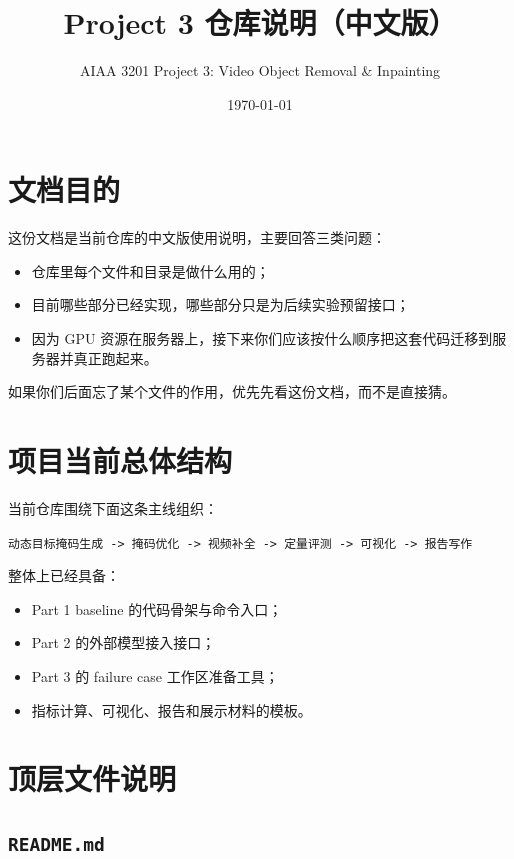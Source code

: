 \documentclass[11pt,a4paper,fontset=none]{ctexart}
\title{Project 3 仓库说明（中文版）}
\author{AIAA 3201 Project 3: Video Object Removal \& Inpainting}
\date{\today}
\begin{document}
\maketitle

\section{文档目的}

这份文档是当前仓库的中文版使用说明，主要回答三类问题：

\begin{itemize}
  \item 仓库里每个文件和目录是做什么用的；
  \item 目前哪些部分已经实现，哪些部分只是为后续实验预留接口；
  \item 因为 GPU 资源在服务器上，接下来你们应该按什么顺序把这套代码迁移到服务器并真正跑起来。
\end{itemize}

如果你们后面忘了某个文件的作用，优先先看这份文档，而不是直接猜。

\section{项目当前总体结构}

当前仓库围绕下面这条主线组织：

\begin{center}
\texttt{动态目标掩码生成 -> 掩码优化 -> 视频补全 -> 定量评测 -> 可视化 -> 报告写作}
\end{center}

整体上已经具备：

\begin{itemize}
  \item Part 1 baseline 的代码骨架与命令入口；
  \item Part 2 的外部模型接入接口；
  \item Part 3 的 failure case 工作区准备工具；
  \item 指标计算、可视化、报告和展示材料的模板。
\end{itemize}

\section{顶层文件说明}

\subsection{\texttt{README.md}}
\end{document}
